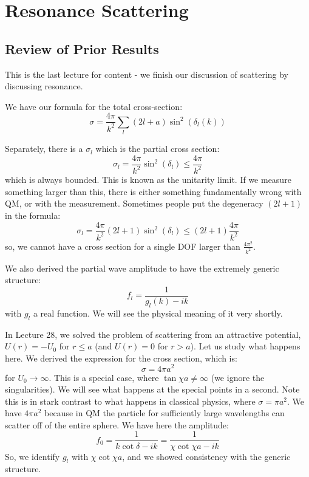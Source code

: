 \section{Resonance Scattering}
\subsection{Review of Prior Results}
This is the last lecture for content - we finish our discussion of scattering by discussing resonance. 

We have our formula for the total cross-section:
\begin{equation}
    \sigma = \frac{4\pi}{k^2}\sum_l (2l + a)\sin^2(\delta_l(k))
\end{equation}

Separately, there is a $\sigma_l$ which is the partial cross section:
\begin{equation}
    \sigma_l = \frac{4\pi}{k^2}\sin^2(\delta_l) \leq \frac{4\pi}{k^2}
\end{equation}
which is always bounded. This is known as the unitarity limit. If we measure something larger than this, there is either something fundamentally wrong with QM, or with the measurement. Sometimes people put the degeneracy $(2l+1)$ in the formula:
\begin{equation}
    \sigma_l = \frac{4\pi}{k^2}(2l+1)\sin^2(\delta_l) \leq (2l+1)\frac{4\pi}{k^2}
\end{equation}
so, we cannot have a cross section for a single DOF larger than $\frac{4\pi^2}{k^2}$.

We also derived the partial wave amplitude to have the extremely generic structure:
\begin{equation}
    f_l = \frac{1}{g_l(k) - ik}
\end{equation}
with $g_l$ a real function. We will see the physical meaning of it very shortly.

In Lecture 28, we solved the problem of scattering from an attractive potential, $U(r) = -U_0$ for $r \leq a$ (and $U(r) = 0$ for $r > a$). Let us study what happens here. We derived the expression for the cross section, which is:
\begin{equation}
    \sigma = 4\pi a^2
\end{equation}
for $U_0 \to \infty$. This is a special case, where $\tan \chi a \neq \infty$ (we ignore the singularities). We will see what happens at the special points in a second. Note this is in stark contrast to what happens in classical physics, where $\sigma = \pi a^2$. We have $4\pi a^2$ because in QM the particle for sufficiently large wavelengths can scatter off of the entire sphere. We have here the amplitude:
\begin{equation}
    f_0 = \frac{1}{k\cot\delta - ik} = \frac{1}{\chi \cot \chi a - ik}
\end{equation}
So, we identify $g_l$ with $\chi \cot \chi a$, and we showed consistency with the generic structure.

